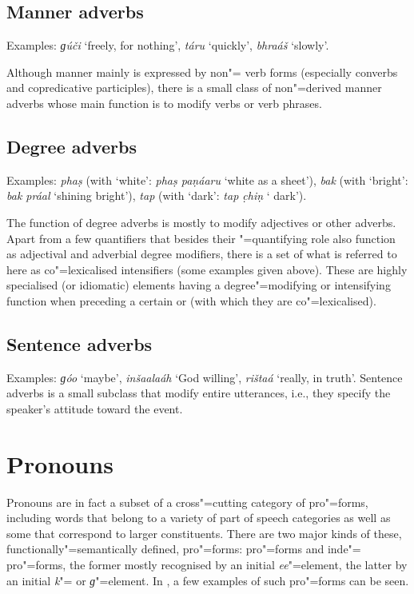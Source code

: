 \subsection{Manner adverbs}
\label{subsec:3b-5-3}
Examples: \textit{ɡúči} `freely, for nothing', \textit{táru} `quickly', \textit{bhraáš} `slowly'.


Although manner mainly is expressed by non"= verb forms (especially converbs and copredicative participles), there is a small class of non"=derived manner adverbs whose main function is to modify verbs or verb phrases.


\subsection{Degree adverbs}
\label{subsec:3b-5-4}
Examples: \textit{phaṣ} (with `white': \textit{phaṣ paṇáaru} `white as a sheet'), \textit{bak} (with `bright': \textit{bak práal} `shining bright'), \textit{tap} (with `dark': \textit{tap c̣hiṇ} ` dark').


The function of degree adverbs is mostly to modify adjectives or other adverbs. Apart from a few quantifiers that besides their "=quantifying role also function as adjectival and adverbial degree modifiers, there is a set of what is referred to here as co"=lexicalised intensifiers (some examples given above). These are highly specialised (or idiomatic) elements having a degree"=modifying or intensifying function when preceding a certain  or  (with which they are co"=lexicalised). 


\subsection{Sentence adverbs}
\label{subsec:3b-5-5}
Examples: \textit{ɡóo} `maybe', \textit{inšaalaáh} `God willing', \textit{rištaá} `really, in truth'.
Sentence adverbs is a small subclass that modify entire utterances, i.e., they specify the speaker’s attitude toward the event.


\section{Pronouns}
\label{sec:3b-6}
Pronouns are in fact a subset of a cross"=cutting category of pro"=forms, including words that belong to a variety of part of speech categories as well as some that correspond to larger constituents. There are two major kinds of these, functionally"=semantically defined, pro"=forms:  pro"=forms and inde"= pro"=forms, the former mostly recognised by an initial \textit{ee}"=element, the latter by an initial \textit{k}"= or \textit{ɡ}"=element. In , a few examples of such pro"=forms can be seen.


